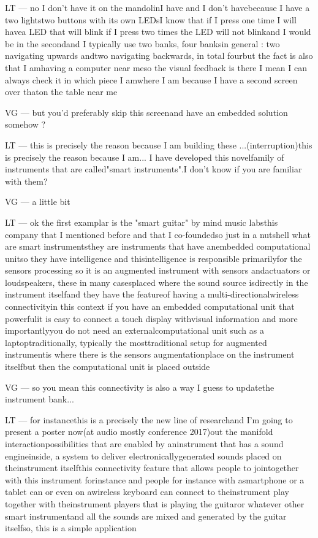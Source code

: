 LT — no I don't have it on the mandolinI have and I don't havebecause I have a two lightstwo buttons with its own LEDsI know that if I press one time I will havea LED that will blink if I press two times the LED will not blinkand I would be in the secondand I typically use two banks, four banksin general : two navigating upwards andtwo navigating backwards, in total fourbut the fact is also that I amhaving a computer near meso the visual feedback is there I mean I can always check it in which piece I amwhere I am because I have a second screen over thaton the table near me

VG — but you'd preferably skip this screenand have an embedded solution somehow ?

LT — this is precisely the reason because I am building these ...(interruption)this is precisely the reason because I am... I have developed this novelfamily of instruments that are called"smart instruments".I don't know if you are familiar with them?

VG — a little bit

LT — ok the first examplar is the "smart guitar" by mind music labsthis company that I mentioned before and that I co-foundedso just in a nutshell what are smart instrumentsthey are instruments that have anembedded computational unitso they have intelligence and thisintelligence is responsible primarilyfor the sensors processing so it is an augmented instrument with sensors andactuators or loudspeakers, these in many casesplaced where the sound source isdirectly in the instrument itselfand they have the featureof having a multi-directionalwireless connectivityin this context if you have an embedded computational unit that powerfulit is easy to connect a touch display withvisual information and more importantlyyou do not need an externalcomputational unit such as a laptoptraditionally, typically the mosttraditional setup for augmented instrumentis where there is the sensors augmentationplace on the instrument itselfbut then the computational unit is placed outside

VG — so you mean this connectivity is also a way I guess to updatethe instrument bank... 

LT — for instancethis is a precisely the new line of researchand I'm going to present a poster now(at audio mostly conference 2017)out the manifold interactionpossibilities that are enabled by aninstrument that has a sound engineinside, a system to deliver electronicallygenerated sounds placed on theinstrument itselfthis connectivity feature that allows people to jointogether with this instrument forinstance and people for instance with asmartphone or a tablet can or even on awireless keyboard can connect to theinstrument play together with theinstrument players that is playing the guitaror whatever other smart instrumentand all the sounds are mixed and generated by the guitar itselfso, this is a simple application

